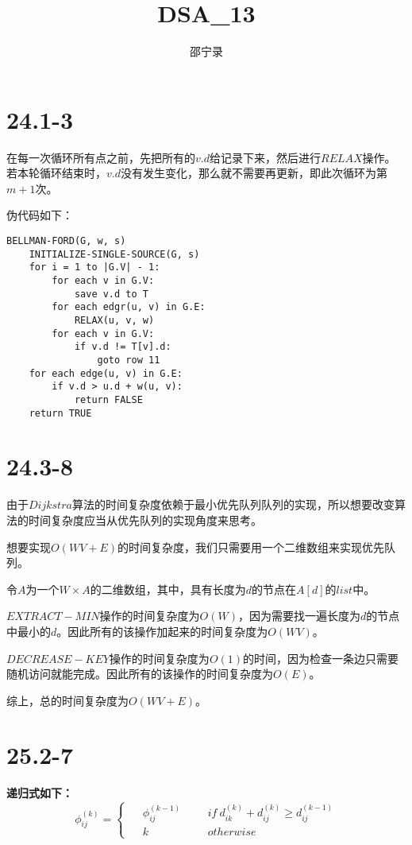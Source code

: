 \documentclass[UTF8]{ctexart}
\title{DSA\_13}
\author{邵宁录\space\space\space\space2018202195}
\begin{document}
    \maketitle
    \section{24.1-3}
    在每一次循环所有点之前，先把所有的$v.d$给记录下来，然后进行$RELAX$操作。
    若本轮循环结束时，$v.d$没有发生变化，那么就不需要再更新，即此次循环为第$m+1$次。

    伪代码如下：
    \begin{lstlisting}
BELLMAN-FORD(G, w, s)
    INITIALIZE-SINGLE-SOURCE(G, s)
    for i = 1 to |G.V| - 1:
        for each v in G.V:
            save v.d to T
        for each edgr(u, v) in G.E:
            RELAX(u, v, w)
        for each v in G.V:
            if v.d != T[v].d:
                goto row 11
    for each edge(u, v) in G.E:
        if v.d > u.d + w(u, v):
            return FALSE
    return TRUE
    \end{lstlisting}
    \section{24.3-8}
    由于$Dijkstra$算法的时间复杂度依赖于最小优先队列队列的实现，所以想要改变算法的时间复杂度应当从优先队列的实现角度来思考。

    想要实现$O(WV+E)$的时间复杂度，我们只需要用一个二维数组来实现优先队列。

    令$A$为一个$W\times A$的二维数组，其中，具有长度为$d$的节点在$A[d]$的$list$中。

    $EXTRACT-MIN$操作的时间复杂度为$O(W)$，因为需要找一遍长度为$d$的节点中最小的$d$。因此所有的该操作加起来的时间复杂度为$O(WV)$。

    $DECREASE-KEY$操作的时间复杂度为$O(1)$的时间，因为检查一条边只需要随机访问就能完成。因此所有的该操作的时间复杂度为$O(E)$。

    综上，总的时间复杂度为$O(WV+E)$。
    \section{25.2-7}
    \textbf{递归式如下：}
    \begin{equation*}
        \phi^{(k)}_{ij}=\left\{\begin{aligned}
            \ \ &\phi^{(k-1)}_{ij}& & & {if\ d^{(k)}_{ik}+d^{(k)}_{ij}\ge d^{(k-1)}_{ij}}\\
            &k& & & {otherwise}
        \end{aligned}
        \right.
    \end{equation*}
\end{document}
